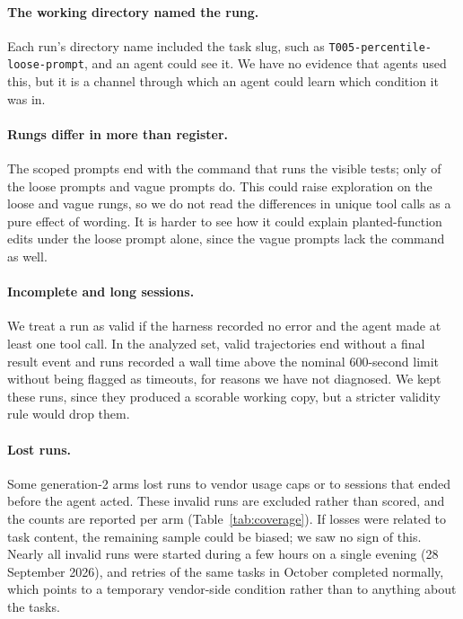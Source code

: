 \paragraph{The working directory named the rung.} Each run's directory name included the task slug, such as
\texttt{T005-percentile-loose-prompt}, and an agent could see it. We have no
evidence that agents used this, but it is a channel through which an agent
could learn which condition it was in.

\paragraph{Rungs differ in more than register.} The scoped prompts end with
the command that runs the visible tests; only \NTestCmdLoose{} of the
\NDomains{} loose prompts and \NTestCmdVague{} vague prompts do. This could raise
exploration on the loose and vague rungs, so we do not read the differences in
unique tool calls as a pure effect of wording. It is harder to see how it
could explain planted-function edits under the loose prompt alone, since the
vague prompts lack the command as well.

\paragraph{Incomplete and long sessions.} We treat a run as valid if the
harness recorded no error and the agent made at least one tool call. In the
analyzed set, \XIncomplete{} valid trajectories end without a final result
event and \XOverTime{} runs recorded a wall time above the nominal 600-second limit
without being flagged as timeouts, for reasons we have not diagnosed. We kept these runs, since they produced a scorable working
copy, but a stricter validity rule would drop them.

\paragraph{Lost runs.} Some generation-2 arms lost runs to vendor usage caps
or to sessions that ended before the agent acted. These invalid runs are
excluded rather than scored, and the counts are reported per arm
(Table~\ref{tab:coverage}). If losses were related
to task content, the remaining sample could be biased; we saw no sign of
this. Nearly all invalid runs were started during a few hours on a single
evening (28 September 2026), and retries of the same tasks in October
completed normally, which points to a temporary vendor-side condition rather
than to anything about the tasks.

